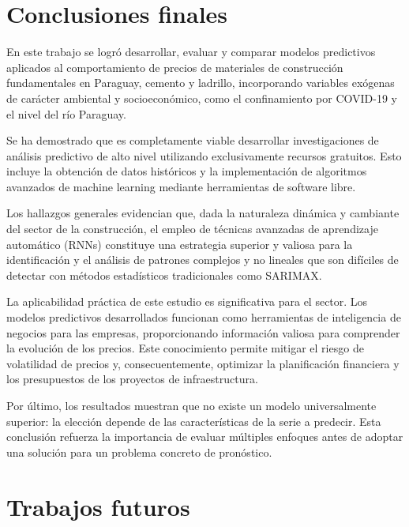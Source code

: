 \vspace{0.5cm}
\section{Conclusiones finales}
\vspace{0.5cm}
\justify
En este trabajo se logró desarrollar, evaluar y comparar modelos predictivos aplicados al comportamiento de precios de materiales de construcción fundamentales en Paraguay, cemento y ladrillo, incorporando variables exógenas de carácter ambiental y socioeconómico, como el confinamiento por COVID-19 y el nivel del río Paraguay.

\justify
Se ha demostrado que es completamente viable desarrollar investigaciones de análisis predictivo de alto nivel utilizando exclusivamente recursos gratuitos. Esto incluye la obtención de datos históricos y la implementación de algoritmos avanzados de machine learning mediante herramientas de software libre.

\justify
Los hallazgos generales evidencian que, dada la naturaleza dinámica y cambiante del sector de la construcción, el empleo de técnicas avanzadas de aprendizaje automático (RNNs) constituye una estrategia superior y valiosa para la identificación y el análisis de patrones complejos y no lineales que son difíciles de detectar con métodos estadísticos tradicionales como SARIMAX.

\justify
La aplicabilidad práctica de este estudio es significativa para el sector. Los modelos predictivos desarrollados funcionan como herramientas de inteligencia de negocios para las empresas, proporcionando información valiosa para comprender la evolución de los precios. Este conocimiento permite mitigar el riesgo de volatilidad de precios y, consecuentemente, optimizar la planificación financiera y los presupuestos de los proyectos de infraestructura.

\justify
Por último, los resultados muestran que no existe un modelo universalmente superior: la elección depende de las características de la serie a predecir. Esta conclusión refuerza la importancia de evaluar múltiples enfoques antes de adoptar una solución para un problema concreto de pronóstico.

\section{Trabajos futuros}

